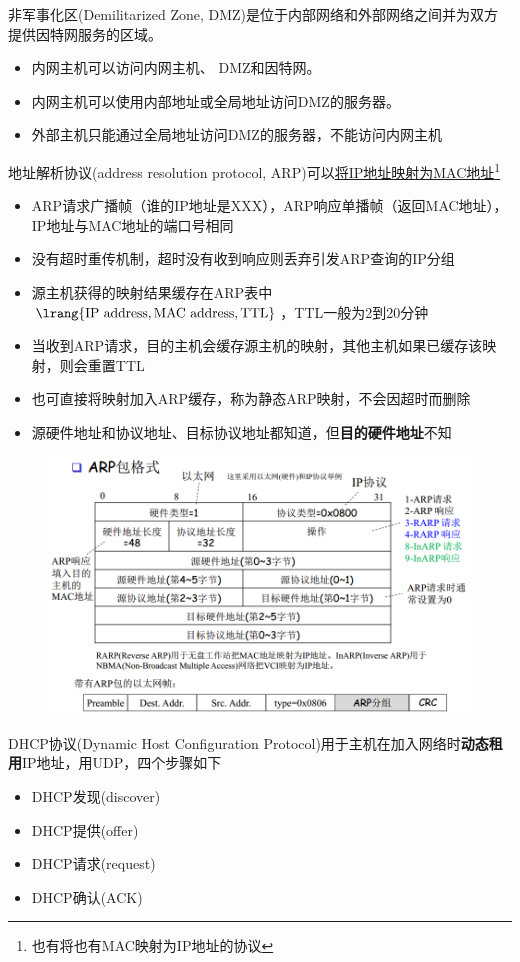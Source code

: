 非军事化区(Demilitarized Zone, DMZ)是位于内部网络和外部网络之间并为双方提供因特网服务的区域。
\begin{itemize}
\item 内网主机可以访问内网主机、 DMZ和因特网。
\item 内网主机可以使用内部地址或全局地址访问DMZ的服务器。
\item 外部主机只能通过全局地址访问DMZ的服务器，不能访问内网主机
\end{itemize}

地址解析协议(address resolution protocol, ARP)可以\underline{将IP地址映射为MAC地址}\footnote{也有将也有MAC映射为IP地址的协议}
\begin{itemize}
	\item ARP请求广播帧（谁的IP地址是XXX），ARP响应单播帧（返回MAC地址），IP地址与MAC地址的端口号相同
	\item 没有超时重传机制，超时没有收到响应则丢弃引发ARP查询的IP分组
	\item 源主机获得的映射结果缓存在ARP表中$\lrang{\text{IP address},\text{MAC address},\text{TTL}}$，TTL一般为2到20分钟
	\item 当收到ARP请求，目的主机会缓存源主机的映射，其他主机如果已缓存该映射，则会重置TTL
	\item 也可直接将映射加入ARP缓存，称为静态ARP映射，不会因超时而删除
	\item 源硬件地址和协议地址、目标协议地址都知道，但\textbf{目的硬件地址}不知
\end{itemize}
\begin{figure}[H]
	\centering
	\includegraphics[width=0.7\linewidth]{fig/ARP.PNG}
\end{figure}

DHCP协议(Dynamic Host Configuration Protocol)用于主机在加入网络时\textbf{动态租用}IP地址，用UDP，四个步骤如下
\begin{itemize}
	\item DHCP发现(discover)
	\item DHCP提供(offer)
	\item DHCP请求(request)
	\item DHCP确认(ACK)
\end{itemize}

